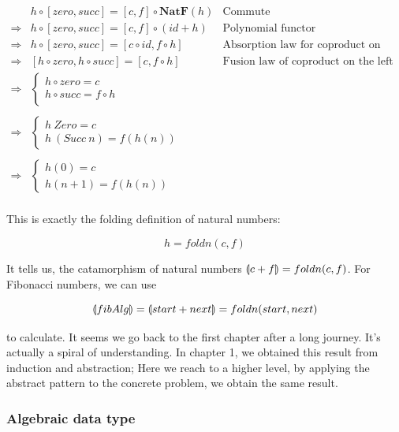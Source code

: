 \documentclass[b5paper]{article}
\begin{document}
\[
\begin{array}{rll}
            & h \circ [zero, succ] = [c, f] \circ \mathbf{NatF}(h) & \text{Commute} \\
\Rightarrow & h \circ [zero, succ] = [c, f] \circ (id + h) & \text{Polynomial functor} \\
\Rightarrow & h \circ [zero, succ] = [c \circ id, f \circ h] & \text{Absorption law for coproduct on the right} \\
\Rightarrow & [h \circ zero, h \circ succ] = [c, f \circ h] & \text{Fusion law of coproduct on the left} \\
\Rightarrow &
  \begin{cases}
    h \circ zero = c \\
    h \circ succ = f \circ h \\
  \end{cases} & \\
\\
\Rightarrow &
  \begin{cases}
    h\ Zero = c \\
    h\ (Succ\ n) = f(h(n))
  \end{cases} & \\
\\
\Rightarrow &
  \begin{cases}
    h(0) = c \\
    h(n + 1) = f(h(n))
  \end{cases} & \\
\end{array}
\]

This is exactly the folding definition of natural numbers:

\[
  h = foldn(c, f)
\]

It tells us, the catamorphism of natural numbers $\llparenthesis c + f \rrparenthesis = foldn(c, f)$. For Fibonacci numbers, we can use

\[
\llparenthesis fibAlg \rrparenthesis = \llparenthesis start + next \rrparenthesis = foldn(start, next)
\]

to calculate. It seems we go back to the first chapter after a long journey. It's actually a spiral of understanding. In chapter 1, we obtained this result from induction and abstraction; Here we reach to a higher level, by applying the abstract pattern to the concrete problem, we obtain the same result.

\subsubsection{Algebraic data type}
\end{document}
